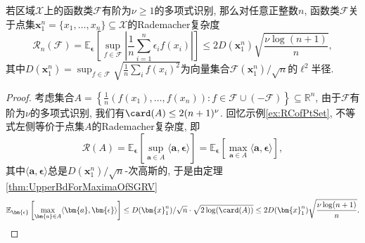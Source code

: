 \begin{lemma}\label{lemma:RCOfPolynomialDiscriminationFunClass}
	若区域$\mathcal{X}$上的函数类$\mathscr{F}$有阶为$\nu \geq 1$的多项式识别, 那么对任意正整数$n$, 函数类$\mathscr{F}$关于点集$\bm{x}_1^n = \{x_1, \dots, x_n\} \subseteq \mathcal{X}$的Rademacher复杂度
	\begin{equation*}
		\mathcal{R}_n(\mathscr{F})
		= \mathbb{E}_{\bm{\epsilon}} \left[ \sup_{f \in \mathscr{F}} \left| \frac{1}{n} \sum_{i=1}^n \epsilon_i f(x_i) \right| \right]
		\leq 2 D(\bm{x}_1^n) \sqrt{\frac{\nu \log(n+1)}{n}}, 
	\end{equation*}
	其中$D(\bm{x}_1^n) = \sup_{f \in \mathscr{F}} \sqrt{\frac{1}{n} \sum_i f(x_i)^2}$为向量集合$\mathscr{F}(\bm{x}_1^n) / \sqrt{n}$的$\ell^2$半径. 
\end{lemma}
\begin{proof}
	考虑集合$A = \left\{ \frac{1}{n} (f(x_1), \dots, f(x_n)) \colon f \in \mathscr{F} \cup (-\mathscr{F}) \right\} \subseteq \mathbb{R}^n$, 由于$\mathscr{F}$有阶为$\nu$的多项式识别, 我们有$\card(A) \leq 2 (n+1)^{\nu}$. 
	回忆示例\ref{ex:RCofPtSet}, 不等式左侧等价于点集$A$的Rademacher复杂度, 即
	\begin{equation*}
		\mathcal{R}(A) 
		= \mathbb{E}_{\bm{\epsilon}}\left[ \sup_{\bm{a} \in A} \langle \bm{a}, \bm{\epsilon} \rangle \right]
		= \mathbb{E}_{\bm{\epsilon}}\left[ \max_{\bm{a} \in A} \langle \bm{a}, \bm{\epsilon} \rangle \right], 
	\end{equation*}
	其中$\langle \bm{a}, \bm{\epsilon} \rangle$总是$D(\bm{x}_1^n) / \sqrt{n}$-次高斯的, 于是由定理\ref{thm:UpperBdForMaximaOfSGRV}
	\begin{align*}
		\mathbb{E}_{\bm{\epsilon}}\left[ \max_{\bm{a} \in A} \langle \bm{a}, \bm{\epsilon} \rangle \right] 
		\leq D(\bm{x}_1^n) / \sqrt{n} \cdot \sqrt{2 \log(\card(A))}
		\leq 2 D(\bm{x}_1^n) \sqrt{\frac{\nu \log(n+1)}{n}}. 
	\end{align*}
\end{proof}

